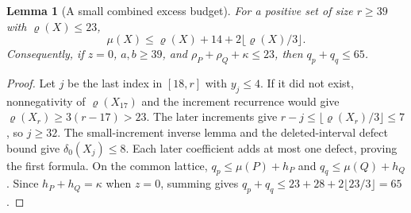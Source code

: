 \documentclass[11pt,a4paper]{article}
\newtheorem{lemma}[theorem]{Lemma}
\theoremstyle{remark}
\newcommand{\rhoD}{\varrho}
\begin{document}
\begin{lemma}[A small combined excess budget]\label{u96:lem:rho23}
For a positive set of size $r\geq39$ with $\rhoD(X)\leq23$,
\[
 \mu(X)\leq\rhoD(X)+14+2\lfloor\rhoD(X)/3\rfloor.
\]
Consequently, if $z=0$, $a,b\geq39$, and
$\rho_P+\rho_Q+\kappa\leq23$, then $q_p+q_q\leq65$.
\end{lemma}
\begin{proof}
Let $j$ be the last index in $[18,r]$ with $y_j\leq4$. If it did not
exist, nonnegativity of $\rhoD(X_{17})$ and the increment recurrence would
give $\rhoD(X_r)\geq3(r-17)>23$. The later increments give
$r-j\leq\lfloor\rhoD(X_r)/3\rfloor\leq7$, so $j\geq32$.
The small-increment inverse lemma and the deleted-interval defect bound
give $\delta_0(X_j)\leq8$. Each later coefficient adds at most one defect,
proving the first formula. On the common lattice,
$q_p\leq\mu(P)+h_P$ and $q_q\leq\mu(Q)+h_Q$.
Since $h_P+h_Q=\kappa$ when $z=0$, summing gives
$q_p+q_q\leq23+28+2\lfloor23/3\rfloor=65$.
\end{proof}
\end{document}
